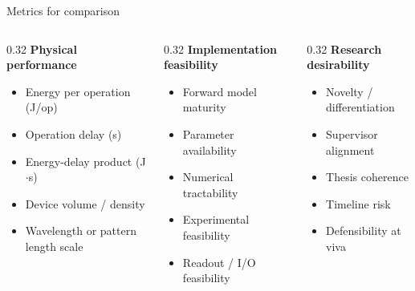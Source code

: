 \documentclass[aspectratio=169,11pt]{beamer}
\begin{document}
\begin{frame}{Metrics for comparison}
  \small
  \begin{columns}[T]
    \begin{column}{0.32\textwidth}
      \textbf{Physical performance}
      \begin{itemize}
        \item Energy per operation (J/op)
        \item Operation delay (s)
        \item Energy-delay product (J$\cdot$s)
        \item Device volume / density
        \item Wavelength or pattern length scale
      \end{itemize}
    \end{column}
    \begin{column}{0.32\textwidth}
      \textbf{Implementation feasibility}
      \begin{itemize}
        \item Forward model maturity
        \item Parameter availability
        \item Numerical tractability
        \item Experimental feasibility
        \item Readout / I/O feasibility
      \end{itemize}
    \end{column}
    \begin{column}{0.32\textwidth}
      \textbf{Research desirability}
      \begin{itemize}
        \item Novelty / differentiation
        \item Supervisor alignment
        \item Thesis coherence
        \item Timeline risk
        \item Defensibility at viva
      \end{itemize}
    \end{column}
  \end{columns}
\end{frame}
\end{document}
